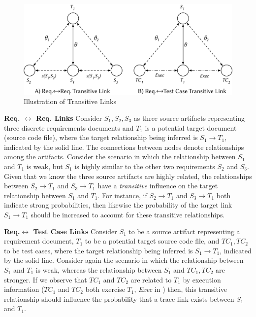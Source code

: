 \begin{figure}%
\centering
\includegraphics[width=\columnwidth]{graphics/chap_04-bayes/fig2_transitive-links.pdf}
\caption{Illustration of Transitive Links}
\label{fig:trans-req2req}
\end{figure}

{\textbf{Req. $\leftrightarrow$ Req. Links}} Consider $S_1,S_2,S_3$ as three source artifacts representing three discrete requirements documents and $T_1$ is a potential target document (\ie source code file), where the target relationship being inferred is $S_1\rightarrow T_1$, indicated by the solid line. The connections between nodes denote relationships among the artifacts. Consider the scenario in which the relationship between $S_1$ and $T_1$ is weak, but $S_1$ is highly similar to the other two requirements $S_2$ and $S_3$. Given that we know the three source artifacts are highly related, the relationships between $S_2\rightarrow T_1$ and $S_3\rightarrow T_1$ have a \textit{transitive} influence on the target relationship between $S_1$ and $T_1$. For instance, if $S_2\rightarrow T_1$ and $S_3\rightarrow T_1$ both indicate strong probabilities, then likewise the probability of the target link $S_1\rightarrow T_1$ should be increased to account for these transitive relationships.

{\textbf{Req.$\leftrightarrow$ Test Case Links}} Consider $S_1$ to be a source artifact representing a requirement document, $T_1$ to be a potential target source code file, and $TC_1,TC_2$ to be test cases, where the target relationship being inferred is $S_1\rightarrow T_1$, indicated by the solid line. Consider again the scenario in which the relationship between $S_1$ and $T_1$ is weak, whereas the relationship between $S_1$ and $TC_1,TC_2$ are stronger. If we observe that $TC_1$ and $TC_2$ are related to $T_1$ by execution information (\eg $TC_1$ and $TC_2$ both exercise $T_1$, \textit{Exec} in ) then, this transitive relationship should influence the probability that a trace link exists between $S_1$ and $T_1$.

